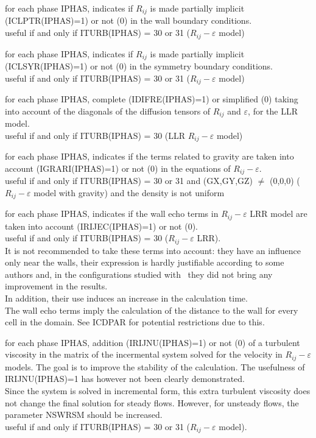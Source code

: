 
{for each phase IPHAS, indicates if $R_{ij}$ is made partially implicit
(ICLPTR(IPHAS)=1) or not (0) in the wall boundary conditions.\\
useful if and only if ITURB(IPHAS) = 30 or 31 ($R_{ij}-\varepsilon$ model)}

{for each phase IPHAS, indicates if $R_{ij}$ is made partially implicit
(ICLSYR(IPHAS)=1) or not (0) in the symmetry boundary conditions.\\
useful if and only if ITURB(IPHAS) = 30 or 31 ($R_{ij}-\varepsilon$ model)}

{for each phase IPHAS, complete (IDIFRE(IPHAS)=1) or simplified (0)
taking into account of the diagonals of the diffusion tensors of $R_{ij}$
and $\varepsilon$, for the LLR model.\\
useful if and only if ITURB(IPHAS) = 30 (LLR $R_{ij}-\varepsilon$ model)}

{for each phase IPHAS, indicates if the terms related to gravity are
taken into account (IGRARI(IPHAS)=1) or not (0) in the equations of
$R_{ij}-\varepsilon$. \\
useful if and only if ITURB(IPHAS) = 30 or 31 and (GX,GY,GZ) $\ne$
(0,0,0) ($R_{ij}-\varepsilon$ model with gravity) and the density is not uniform}

{for each phase IPHAS, indicates if the wall echo terms in
$R_{ij}-\varepsilon$ LRR model are
taken into account (IRIJEC(IPHAS)=1) or not (0).\\
useful if and only if ITURB(IPHAS) = 30 ($R_{ij}-\varepsilon$ LRR).\\
It is not recommended to take these terms into account:
they have an influence only near the walls, their expression is hardly
justifiable according to some authors and, in the configurations
studied with \CS\, they did not bring any improvement in the results.\\
In addition, their use induces an increase in the calculation
time.\\
The wall echo terms imply the calculation of the distance to the wall
for every cell in the domain. See ICDPAR for potential restrictions due
to this.}

{for each phase IPHAS, addition (IRIJNU(IPHAS)=1) or not (0) of a
turbulent viscosity in the matrix of the incermental system solved
for the velocity in $R_{ij}-\varepsilon$ models. The goal is to improve
the stability of the calculation. The usefulness of IRIJNU(IPHAS)=1 has
however not been clearly demonstrated.\\
Since the system is solved in incremental form, this extra turbulent
viscosity does not change the final solution for steady flows. However,
for unsteady flows, the parameter NSWRSM should be increased.\\
useful if and only if ITURB(IPHAS) = 30 or 31 ($R_{ij}-\varepsilon$ model).}

